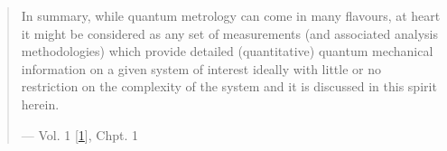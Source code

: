 \documentclass[letterpaper,table,10pt,english]{jupyterBook}
\begin{document}
\begin{quote}

\sphinxAtStartPar
In summary, while quantum metrology can come in many flavours, at heart it might be considered as any set of measurements (and associated analysis methodologies) which provide detailed (quantitative) quantum mechanical information on a given system of interest \sphinxhyphen{} ideally with little or no restriction on the complexity of the system \sphinxhyphen{} and it is discussed in this spirit herein.

\begin{flushright}
--- Vol. 1 {[}\hyperlink{cite.backmatter/bibliography:id569}{1}{]}, Chpt. 1
\end{flushright}
\end{quote}
\end{document}
